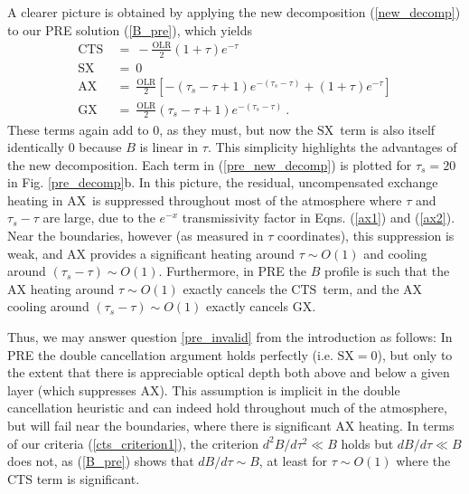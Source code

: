 \documentclass{ametsoc}
\newcommand{\beqn}{\begin{equation}}
\newcommand{\eeqn}{\end{equation}}
\newcommand{\eqnref}[1]{(\ref{#1})}
\newcommand{\OLR}{\ensuremath{\mathrm{OLR}}}
\newcommand{\taus}{\ensuremath{\tau_s}}
\newcommand{\SX}{\ensuremath{\mathrm{SX}}}
\newcommand{\AX}{\ensuremath{\mathrm{AX}}}
\newcommand{\GX}{\ensuremath{\mathrm{GX}}}
\newcommand{\CTS}{\ensuremath{\mathrm{CTS}}}
\begin{document}
A clearer picture is obtained by applying the new decomposition \eqnref{new_decomp} to our PRE solution \eqnref{B_pre},  which yields
\beqn
	\begin{split}
		\CTS &\ =\  -\frac{\OLR}{2}(1+\tau)e^{-\tau} \\
		\SX   &\ =\  0 \\
		\AX   &\ =\  \frac{\OLR}{2}\left[-(\taus-\tau+1)e^{-(\taus-\tau)} + (1+\tau) e^{-\tau} \right] \\
		\GX   &\ =\  \frac{\OLR}{2}(\taus-\tau+1)e^{-(\taus-\tau)}  \ .
	\end{split}
	\label{pre_new_decomp}
\eeqn
These terms again add to 0, as they must, but now  the \SX\ term is also itself identically 0 because $B$ is linear in $\tau$. This simplicity highlights the advantages of the new decomposition. Each term in \eqnref{pre_new_decomp} is plotted for $\taus=20$ in Fig. \ref{pre_decomp}b. In this picture, the residual, uncompensated exchange heating in \AX\ is suppressed  throughout most of the atmosphere where $\tau$ and $\taus-\tau$ are large, due to the $e^{-x}$ transmissivity factor in Eqns. \eqnref{ax1} and \eqnref{ax2}. Near the boundaries, however (as measured in $\tau$ coordinates), this  suppression is weak, and AX provides a significant heating around $\tau\sim O(1)$  and  cooling around $(\taus-\tau)\sim O(1)$. Furthermore, in PRE  the $B$ profile is such that the AX heating around $\tau\sim O(1)$ exactly cancels the \CTS\ term, and the AX cooling around $(\taus-\tau)\sim O(1)$ exactly cancels \GX. 

Thus, we may answer question \ref{pre_invalid} from the introduction as follows: In PRE the double cancellation argument holds perfectly (i.e. $\SX=0$), but only to the extent that there is appreciable optical depth both above and below a given layer (which suppresses \AX). This assumption is implicit in the double cancellation heuristic and can indeed hold throughout much of the atmosphere, but will fail near the boundaries, where there is significant AX heating.  In terms of our criteria \eqnref{cts_criterion1}, the criterion $d^2 B/d \tau^2 \ll B$  holds but  $d B/d \tau \ll B$  does not, as \eqnref{B_pre} shows that $dB/d\tau \sim B$, at least for $\tau \sim O(1)$ where the CTS term is significant.

\end{document}
